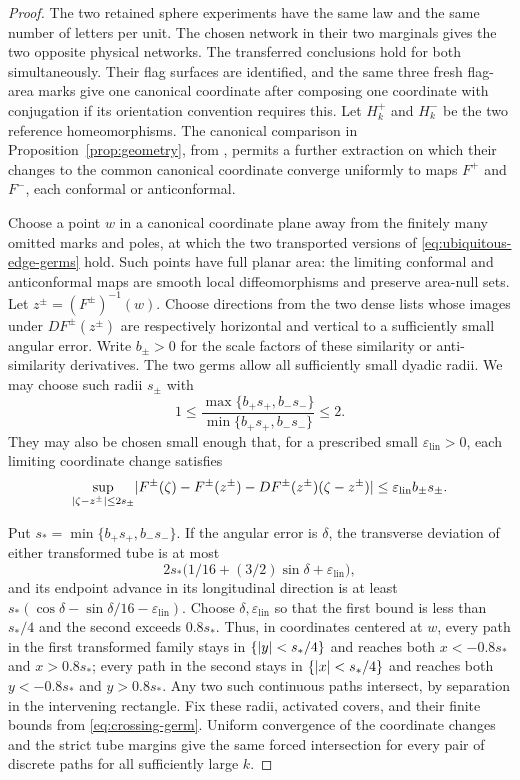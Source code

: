 \begin{proof}
The two retained sphere experiments have the same law and the same number
of letters per unit.  The chosen network in their two marginals gives the
two opposite physical networks.  The transferred conclusions hold for
both simultaneously.  Their flag surfaces are identified, and the
same three fresh flag-area marks give one canonical coordinate after
composing one coordinate with conjugation if its orientation convention
requires this.  Let \(H_k^+\) and \(H_k^-\) be the two reference
homeomorphisms.  The canonical comparison in Proposition~\ref{prop:geometry},
from \cite[Theorem~8.8]{C}, permits a further extraction on which their changes
to the common canonical coordinate converge uniformly to maps \(F^+\)
and \(F^-\), each conformal or anticonformal.

Choose a point \(w\) in a canonical coordinate plane away from the finitely
many omitted marks and poles, at which the two transported versions of
\eqref{eq:ubiquitous-edge-germs} hold.  Such points have full planar area:
the limiting conformal and anticonformal maps are smooth local
diffeomorphisms and preserve area-null sets.  Let \(z^\pm=(F^\pm)^{-1}(w)\).
Choose directions from the two dense lists whose images under
\(DF^\pm(z^\pm)\) are respectively horizontal and vertical to a
sufficiently small angular error.  Write \(b_\pm>0\) for the scale factors
of these similarity or anti-similarity derivatives.  The two germs allow
all sufficiently small dyadic radii.  We may choose such radii \(s_\pm\)
with
\[
 1\le
 \frac{\max\{b_+s_+,b_-s_-\}}{\min\{b_+s_+,b_-s_-\}}
 \le2.
\]
They may also be chosen small enough that, for a prescribed small
\(\varepsilon_{\mathrm{lin}}>0\), each limiting coordinate change satisfies
\[
 \sup_{\lvert \zeta-z^\pm\rvert\le2s_\pm}
 \lvert F^\pm(\zeta)-F^\pm(z^\pm)-DF^\pm(z^\pm)(\zeta-z^\pm)\rvert
 \le \varepsilon_{\mathrm{lin}} b_\pm s_\pm .
\]

Put \(s_*=\min\{b_+s_+,b_-s_-\}\).  If the angular error is \(\delta\),
the transverse deviation of either transformed tube is at most
\[
 2s_*\bigl(1/16+(3/2)\sin\delta+\varepsilon_{\mathrm{lin}}\bigr),
\]
and its endpoint advance in its longitudinal direction is at least
\(s_*(\cos\delta-\sin\delta/16-\varepsilon_{\mathrm{lin}})\).
Choose \(\delta,\varepsilon_{\mathrm{lin}}\) so that
the first bound is less than \(s_*/4\) and the second exceeds \(0.8s_*\).
Thus, in coordinates centered at \(w\), every path in
the first transformed family stays in \(\{\lvert y\rvert<s_*/4\}\) and reaches
both \(x<-0.8s_*\) and \(x>0.8s_*\); every path in the second stays in
\(\{\lvert x\rvert<s_*/4\}\) and reaches both \(y<-0.8s_*\) and \(y>0.8s_*\).
Any two such continuous paths intersect, by separation in the intervening
rectangle.  Fix these radii, activated covers, and their finite bounds
from \eqref{eq:crossing-germ}.  Uniform convergence of the coordinate
changes and the strict tube margins give the same forced intersection
for every pair of discrete paths for all sufficiently large \(k\).


\end{proof}
